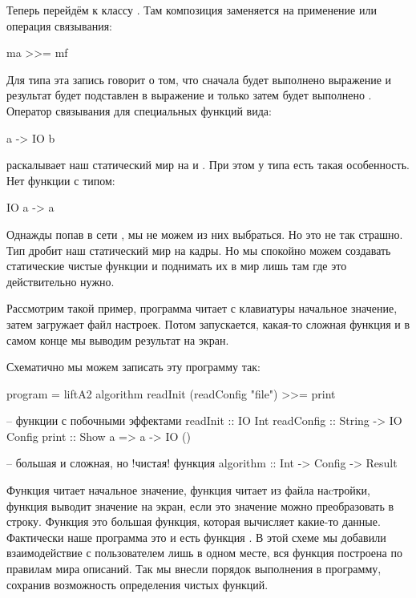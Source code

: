 Теперь перейдём к классу . Там композиция
заменяется на применение или операция связывания:

\begin{code}
ma >>= mf
\end{code}

Для типа  эта запись говорит о том, что сначала будет выполнено
выражение  и результат будет подставлен в 
выражение  и только затем будет выполнено .
Оператор связывания для специальных функций вида:

\begin{code}
a -> IO b
\end{code}

раскалывает наш статический мир на  и . 
При этом у типа  есть такая особенность. 
Нет функции с типом:

\begin{code}
IO a -> a
\end{code}

Однажды попав в сети , мы не можем из них 
выбраться. Но это не так страшно. Тип 
дробит наш статический мир на кадры. Но мы
спокойно можем создавать статические чистые функции
и поднимать их в мир  лишь там где это
действительно нужно. 

Рассмотрим такой пример, программа читает с клавиатуры
начальное значение, затем загружает файл настроек. 
Потом запускается, какая-то сложная функция и 
в самом конце мы выводим результат на экран.

Схематично мы можем записать эту программу так:

\begin{code}
program = liftA2 algorithm readInit (readConfig "file") >>= print

-- функции с побочными эффектами
readInit   :: IO Int
readConfig :: String -> IO Config
print      :: Show a => a -> IO ()

-- большая и сложная, но !чистая! функция
algorithm  :: Int -> Config -> Result
\end{code}

Функция  читает начальное значение, 
функция  читает из файла наcтройки,
функция   выводит значение на экран,
если это значение можно преобразовать в строку. 
Функция  это большая функция,
которая вычисляет какие-то данные. Фактически
наше программа это и есть функция .
В этой схеме мы добавили взаимодействие с пользователем
лишь в одном месте, вся функция  
построена по правилам мира описаний. Так мы 
внесли порядок выполнения в программу, сохранив
возможность определения чистых функций.

